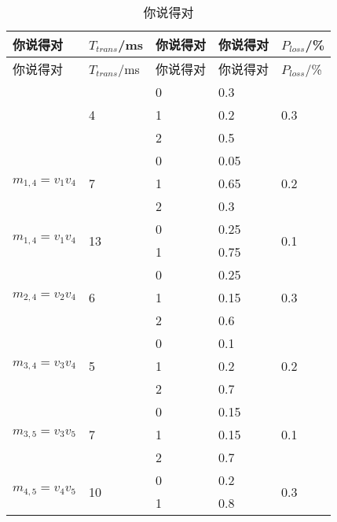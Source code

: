 \begin{longtable}[!ht]{lllll}
	\caption{你说得对}
	\label{config2-3}
	\hline
	你说得对                                                 & $T_{trans}$/ms      & 你说得对 & 你说得对 & $P_{loss}$/\%        \\ 
	\hline
	\endfirsthead
	\hline
	你说得对                                                 & $T_{trans}$/ms      & 你说得对 & 你说得对 & $P_{loss}$/\%        \\ 
	\hline
	\endhead
	
	\hline 
	\endfoot
	
	\multirow{3}{*}{$m_{1,2}=v_1 v_2$}                     & \multirow{3}{*}{4}  & 0  & 0.3  & \multirow{3}{*}{0.3} \\
	&                     & 1  & 0.2  &                      \\
	&                     & 2  & 0.5  &                      \\ \hline
	
	\multirow{3}{*}{$m_{1,4}=v_1 v_4$}                     & \multirow{3}{*}{7}  & 0  & 0.05  & \multirow{3}{*}{0.2} \\
	&                     & 1  & 0.65  &                      \\
	&                     & 2  & 0.3  &                      \\ \hline
	
	\multirow{2}{*}{$m_{1,4}=v_1 v_4$}                     & \multirow{2}{*}{13}  & 0  & 0.25  & \multirow{2}{*}{0.1} \\
	&                     & 1  & 0.75  &                      \\ \hline
	\multirow{3}{*}{$m_{2,4}=v_2 v_4$}                     & \multirow{3}{*}{6}  & 0  & 0.25  & \multirow{3}{*}{0.3} \\
	&                     & 1  & 0.15  &                      \\
	&                     & 2  & 0.6  &                      \\ \hline
	
	\multirow{3}{*}{$m_{3,4}=v_3 v_4$}                     & \multirow{3}{*}{5}  & 0  & 0.1  & \multirow{3}{*}{0.2} \\
	&                     & 1  & 0.2  &                      \\
	&                     & 2  & 0.7  &                      \\ \hline
	
	\multirow{3}{*}{$m_{3,5}=v_3 v_5$}                     & \multirow{3}{*}{7}  & 0  & 0.15  & \multirow{3}{*}{0.1} \\
	&                     & 1  & 0.15  &                      \\
	&                     & 2  & 0.7  &                      \\ \hline
	
	\multirow{2}{*}{$m_{4,5}=v_4 v_5$}                     & \multirow{2}{*}{10}  & 0  & 0.2  & \multirow{2}{*}{0.3} \\
	&                     & 1  & 0.8  &                      \\ \hline
\end{longtable}
